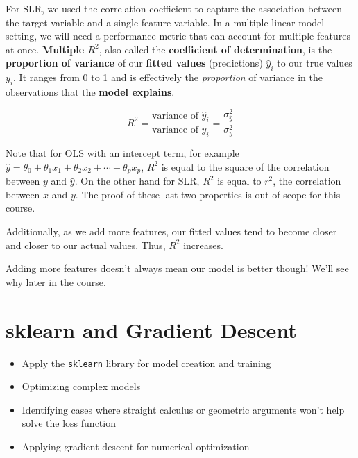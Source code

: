 \documentclass[
  letterpaper,
  DIV=11,
  numbers=noendperiod]{scrreprt}
\providecommand{\tightlist}{%
  \setlength{\itemsep}{0pt}\setlength{\parskip}{0pt}}\usepackage{longtable,booktabs,array}
\begin{document}
For SLR, we used the correlation coefficient to capture the association
between the target variable and a single feature variable. In a multiple
linear model setting, we will need a performance metric that can account
for multiple features at once. \textbf{Multiple \(R^2\)}, also called
the \textbf{coefficient of determination}, is the \textbf{proportion of
variance} of our \textbf{fitted values} (predictions) \(\hat{y}_i\) to
our true values \(y_i\). It ranges from 0 to 1 and is effectively the
\emph{proportion} of variance in the observations that the \textbf{model
explains}.

\[R^2 = \frac{\text{variance of } \hat{y}_i}{\text{variance of } y_i} = \frac{\sigma^2_{\hat{y}}}{\sigma^2_y}\]

Note that for OLS with an intercept term, for example
\(\hat{y} = \theta_0 + \theta_1x_1 + \theta_2x_2 + \cdots + \theta_px_p\),
\(R^2\) is equal to the square of the correlation between \(y\) and
\(\hat{y}\). On the other hand for SLR, \(R^2\) is equal to \(r^2\), the
correlation between \(x\) and \(y\). The proof of these last two
properties is out of scope for this course.

Additionally, as we add more features, our fitted values tend to become
closer and closer to our actual values. Thus, \(R^2\) increases.

Adding more features doesn't always mean our model is better though!
We'll see why later in the course.


\chapter{sklearn and Gradient
Descent}\label{sklearn-and-gradient-descent}

\begin{tcolorbox}[enhanced jigsaw, arc=.35mm, left=2mm, toprule=.15mm, leftrule=.75mm, bottomrule=.15mm, colframe=quarto-callout-note-color-frame, rightrule=.15mm, colbacktitle=quarto-callout-note-color!10!white, opacitybacktitle=0.6, coltitle=black, bottomtitle=1mm, colback=white, toptitle=1mm, title=\textcolor{quarto-callout-note-color}{\faInfo}\hspace{0.5em}{Learning Outcomes}, breakable, opacityback=0, titlerule=0mm]

\begin{itemize}
\tightlist
\item
  Apply the \texttt{sklearn} library for model creation and training
\item
  Optimizing complex models
\item
  Identifying cases where straight calculus or geometric arguments won't
  help solve the loss function
\item
  Applying gradient descent for numerical optimization
\end{itemize}

\end{tcolorbox}
\end{document}
